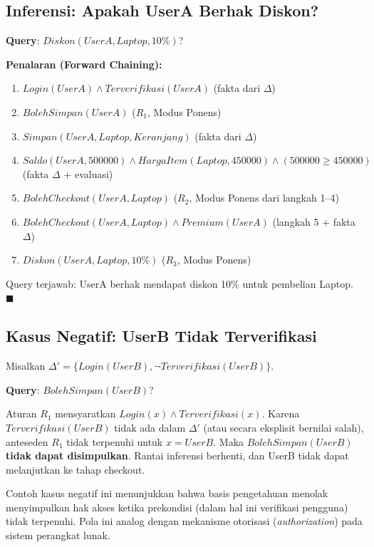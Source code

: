 \subsection{Inferensi: Apakah UserA Berhak Diskon?}

\begin{contoh}
\textbf{Query}: $Diskon(UserA, Laptop, 10\%)$?

\textbf{Penalaran (Forward Chaining):}
\begin{enumerate}
    \item $Login(UserA) \wedge Terverifikasi(UserA)$ \hfill (fakta dari $\Delta$)
    \item $BolehSimpan(UserA)$ \hfill ($R_1$, Modus Ponens)
    \item $Simpan(UserA, Laptop, Keranjang)$ \hfill (fakta dari $\Delta$)
    \item $Saldo(UserA, 500000) \wedge HargaItem(Laptop, 450000) \wedge (500000 \geq 450000)$
    \hfill (fakta $\Delta$ + evaluasi)
    \item $BolehCheckout(UserA, Laptop)$ \hfill ($R_2$, Modus Ponens dari langkah 1--4)
    \item $BolehCheckout(UserA, Laptop) \wedge Premium(UserA)$ \hfill (langkah 5 + fakta $\Delta$)
    \item $Diskon(UserA, Laptop, 10\%)$ \hfill ($R_3$, Modus Ponens)
\end{enumerate}

Query terjawab: UserA berhak mendapat diskon 10\% untuk pembelian Laptop. $\blacksquare$
\end{contoh}

\subsection{Kasus Negatif: UserB Tidak Terverifikasi}

\begin{contoh}
Misalkan $\Delta' = \{Login(UserB), \neg Terverifikasi(UserB)\}$.

\textbf{Query}: $BolehSimpan(UserB)$?

Aturan $R_1$ mensyaratkan $Login(x) \wedge Terverifikasi(x)$. Karena $Terverifikasi(UserB)$ tidak ada dalam $\Delta'$ (atau secara eksplisit bernilai salah), anteseden $R_1$ tidak terpenuhi untuk $x = UserB$. Maka $BolehSimpan(UserB)$ \textbf{tidak dapat disimpulkan}. Rantai inferensi berhenti, dan UserB tidak dapat melanjutkan ke tahap checkout.
\end{contoh}

\begin{catatan}
Contoh kasus negatif ini menunjukkan bahwa basis pengetahuan menolak menyimpulkan hak akses ketika prekondisi (dalam hal ini verifikasi pengguna) tidak terpenuhi. Pola ini analog dengan mekanisme otorisasi (\textit{authorization}) pada sistem perangkat lunak.
\end{catatan}
